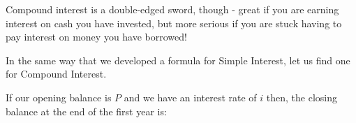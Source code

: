       \label{m39334*id72647}Compound interest is a double-edged sword, though - great if you are earning interest on cash you have invested, but more serious if you are stuck having to pay interest on money you have borrowed!\par 
      \label{m39334*id72652}In the same way that we developed a formula for Simple Interest, let us find one for Compound Interest.\par 
      \label{m39334*id72656}If our opening balance is \begin{math}P\end{math} and we have an interest rate of \begin{math}i\end{math} then, the closing balance at the end of the first year is:\par 
      \label{m39334*id72678}\nopagebreak\noindent{}
    
